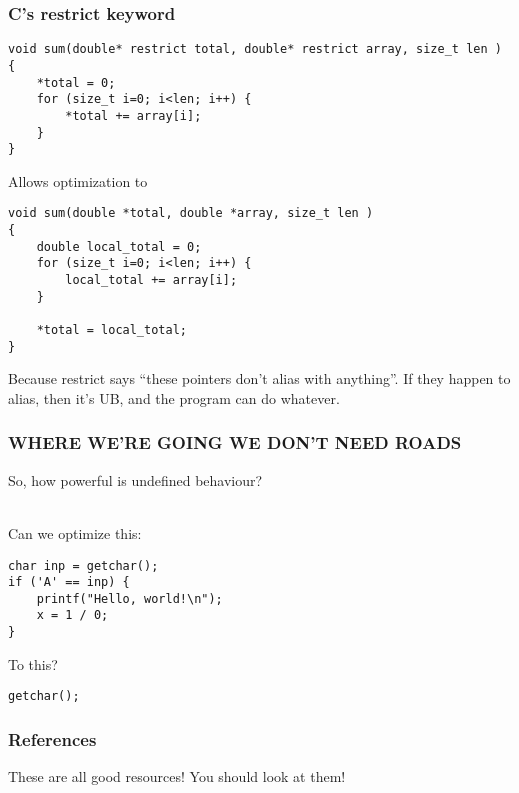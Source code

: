 \documentclass{beamer}
\begin{document}
\begin{frame}[fragile]
  \frametitle{C's restrict keyword}

\begin{lstlisting}
void sum(double* restrict total, double* restrict array, size_t len )
{
    *total = 0;
    for (size_t i=0; i<len; i++) {
        *total += array[i];
    }
}
\end{lstlisting}

  Allows optimization to

\begin{lstlisting}
void sum(double *total, double *array, size_t len )
{
    double local_total = 0;
    for (size_t i=0; i<len; i++) {
        local_total += array[i];
    }

    *total = local_total;
}
\end{lstlisting}

  Because restrict says ``these pointers don't alias with
  anything''. If they happen to alias, then it's UB, and the program
  can do whatever.

\end{frame}

\begin{frame}[fragile]
  \frametitle{WHERE WE'RE GOING WE DON'T NEED ROADS}

  \pause
  So, how powerful is undefined behaviour?\\~

  \pause
  Can we optimize this:

\begin{lstlisting}
char inp = getchar();
if ('A' == inp) {
    printf("Hello, world!\n");
    x = 1 / 0;
}
\end{lstlisting}

  \pause

  To this?

\begin{lstlisting}
getchar();
\end{lstlisting}
  
\end{frame}

\begin{frame}
  \frametitle{References}

  \nocite{*}
  \printbibliography

  These are all good resources! You should look at them!
\end{frame}
\end{document}
